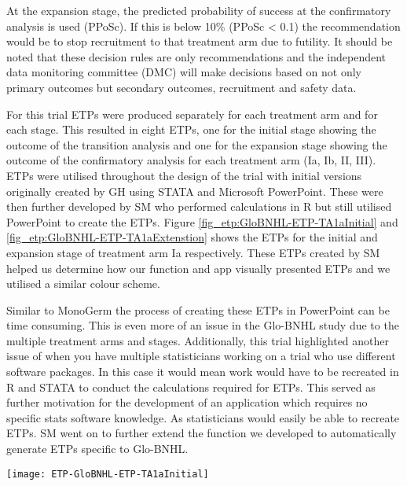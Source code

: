 At the expansion stage, the predicted probability of success at the confirmatory analysis is used (PPoSc). If this is below 10\% (PPoSc < 0.1) the recommendation would be to stop recruitment to that treatment arm due to futility. It should be noted that these decision rules are only recommendations and the independent data monitoring committee (DMC) will make decisions based on not only primary outcomes but secondary outcomes, recruitment and safety data. 

For this trial ETPs were produced separately for each treatment arm and for each stage. This resulted in eight ETPs, one for the initial stage showing the outcome of the transition analysis and one for the expansion stage showing the outcome of the confirmatory analysis for each treatment arm (\RN{1}a, \RN{1}b, \RN{2}, \RN{3}). ETPs were utilised throughout the design of the trial with initial versions originally created by GH using STATA and Microsoft PowerPoint. These were then further developed by SM who performed calculations in R but still utilised PowerPoint to create the ETPs. Figure \ref{fig_etp:GloBNHL-ETP-TA1aInitial} and \ref{fig_etp:GloBNHL-ETP-TA1aExtenstion} shows the ETPs for the initial and expansion stage of treatment arm \RN{1}a respectively. These ETPs created by SM helped us determine how our function and app visually presented ETPs and we utilised a similar colour scheme. 

Similar to MonoGerm the process of creating these ETPs in PowerPoint can be time consuming. This is even more of an issue in the Glo-BNHL study due to the multiple treatment arms and stages. Additionally, this trial highlighted another issue of when you have multiple statisticians working on a trial who use different software packages. In this case it would mean work would have to be recreated in R and STATA to conduct the calculations required for ETPs. This served as further motivation for the development of an application which requires no specific stats software knowledge. As statisticians would easily be able to recreate ETPs. SM went on to further extend the function we developed to automatically generate ETPs specific to Glo-BNHL. 

\begin{sidewaysfigure}[h!]
	\centering
	\caption{ETP for the initial stage of treatment arm \RN{1}a in Glo-BNHL.}
	\label{fig_etp:GloBNHL-ETP-TA1aInitial}
	\texttt{[image: ETP-GloBNHL-ETP-TA1aInitial]}
\end{sidewaysfigure} 


